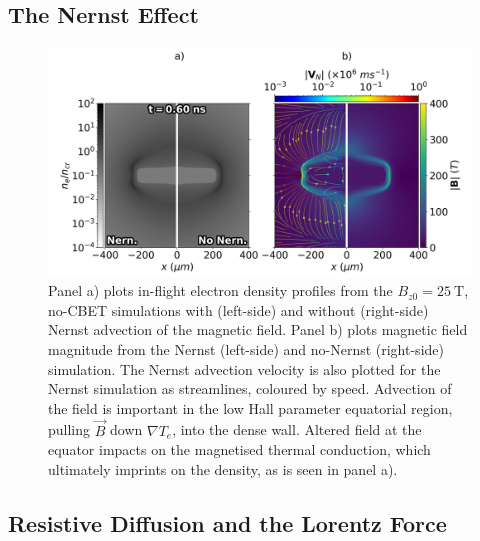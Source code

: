 \subsection{The Nernst Effect}%
\label{sec:Res2_nernst}


\begin{figure}[t!]
    \includegraphics[width=0.8\linewidth]{Results2/Images/nernst_comp.png}
    \centering
    \caption{Panel a) plots in-flight electron density profiles from the $B_{z0}=25\ \text{T}$, no-\ac{CBET} simulations with (left-side) and without (right-side) Nernst advection of the magnetic field.
    Panel b) plots magnetic field magnitude from the Nernst (left-side) and no-Nernst (right-side) simulation.
    The Nernst advection velocity is also plotted for the Nernst simulation as streamlines, coloured by speed.
    Advection of the field is important in the low Hall parameter equatorial region, pulling $\vec{B}$ down $\nabla T_e$, into the dense wall.
    Altered field at the equator impacts on the magnetised thermal conduction, which ultimately imprints on the density, as is seen in panel a).}%
    \label{fig:Res2_nernst_comp}
\end{figure}



\subsection{Resistive Diffusion and the Lorentz Force}%
\label{sec:Res2_resis}

